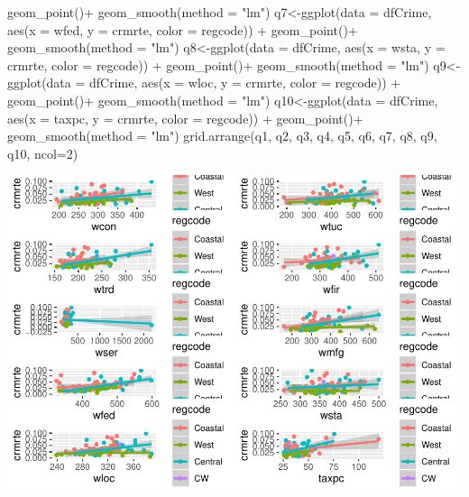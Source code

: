 \documentclass[]{article}
\newenvironment{Shaded}{}{}
\newcommand{\DataTypeTok}[1]{#1}
\newcommand{\DecValTok}[1]{#1}
\newcommand{\KeywordTok}[1]{\textcolor[rgb]{0.00,0.00,1.00}{#1}}
\newcommand{\NormalTok}[1]{#1}
\newcommand{\OperatorTok}[1]{#1}
\newcommand{\StringTok}[1]{\textcolor[rgb]{0.00,0.50,0.50}{#1}}
\begin{document}
\begin{Shaded}
\begin{Highlighting}[]
\StringTok{      }\KeywordTok{geom_point}\NormalTok{()}\OperatorTok{+}
\StringTok{  }\KeywordTok{geom_smooth}\NormalTok{(}\DataTypeTok{method =} \StringTok{"lm"}\NormalTok{)}
\NormalTok{q7<-}\KeywordTok{ggplot}\NormalTok{(}\DataTypeTok{data =}\NormalTok{ dfCrime, }\KeywordTok{aes}\NormalTok{(}\DataTypeTok{x =}\NormalTok{ wfed, }\DataTypeTok{y =}\NormalTok{ crmrte, }\DataTypeTok{color =}\NormalTok{ regcode)) }\OperatorTok{+}\StringTok{ }
\StringTok{      }\KeywordTok{geom_point}\NormalTok{()}\OperatorTok{+}
\StringTok{  }\KeywordTok{geom_smooth}\NormalTok{(}\DataTypeTok{method =} \StringTok{"lm"}\NormalTok{)}
\NormalTok{q8<-}\KeywordTok{ggplot}\NormalTok{(}\DataTypeTok{data =}\NormalTok{ dfCrime, }\KeywordTok{aes}\NormalTok{(}\DataTypeTok{x =}\NormalTok{ wsta, }\DataTypeTok{y =}\NormalTok{ crmrte, }\DataTypeTok{color =}\NormalTok{ regcode)) }\OperatorTok{+}\StringTok{ }
\StringTok{      }\KeywordTok{geom_point}\NormalTok{()}\OperatorTok{+}
\StringTok{  }\KeywordTok{geom_smooth}\NormalTok{(}\DataTypeTok{method =} \StringTok{"lm"}\NormalTok{)}
\NormalTok{q9<-}\KeywordTok{ggplot}\NormalTok{(}\DataTypeTok{data =}\NormalTok{ dfCrime, }\KeywordTok{aes}\NormalTok{(}\DataTypeTok{x =}\NormalTok{ wloc, }\DataTypeTok{y =}\NormalTok{ crmrte, }\DataTypeTok{color =}\NormalTok{ regcode)) }\OperatorTok{+}\StringTok{ }
\StringTok{      }\KeywordTok{geom_point}\NormalTok{()}\OperatorTok{+}
\StringTok{  }\KeywordTok{geom_smooth}\NormalTok{(}\DataTypeTok{method =} \StringTok{"lm"}\NormalTok{)}
\NormalTok{q10<-}\KeywordTok{ggplot}\NormalTok{(}\DataTypeTok{data =}\NormalTok{ dfCrime, }\KeywordTok{aes}\NormalTok{(}\DataTypeTok{x =}\NormalTok{ taxpc, }\DataTypeTok{y =}\NormalTok{ crmrte, }\DataTypeTok{color =}\NormalTok{ regcode)) }\OperatorTok{+}\StringTok{ }
\StringTok{      }\KeywordTok{geom_point}\NormalTok{()}\OperatorTok{+}
\StringTok{  }\KeywordTok{geom_smooth}\NormalTok{(}\DataTypeTok{method =} \StringTok{"lm"}\NormalTok{)}
\KeywordTok{grid.arrange}\NormalTok{(q1, q2, q3, q4, q5, q6, q7, q8, q9, q10, }\DataTypeTok{ncol=}\DecValTok{2}\NormalTok{)}
\end{Highlighting}
\end{Shaded}

\includegraphics{Bagnard_Gaustad_Hartman_Leung_Lab_3_files/figure-latex/unnamed-chunk-15-1.pdf}
\end{document}
